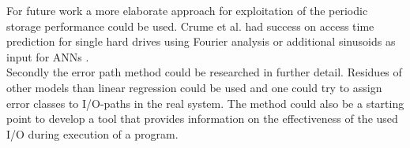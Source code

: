\documentclass{superfri}
\begin{document}
For future work a more elaborate approach for exploitation of the periodic storage performance could be used. 
Crume et al. had success on access time prediction for single hard drives using Fourier analysis \cite{Crume:2013:FML:2538542.2538561} or additional sinusoids as input for ANNs \cite{crumelatent}.\\
Secondly the error path method could be researched in further detail.
Residues of other models than linear regression could be used and one could try to assign error classes to I/O-paths in the real system.
The method could also be a starting point to develop a tool that provides information on the effectiveness of the used I/O during execution of a program.

\openaccess



\end{document}
